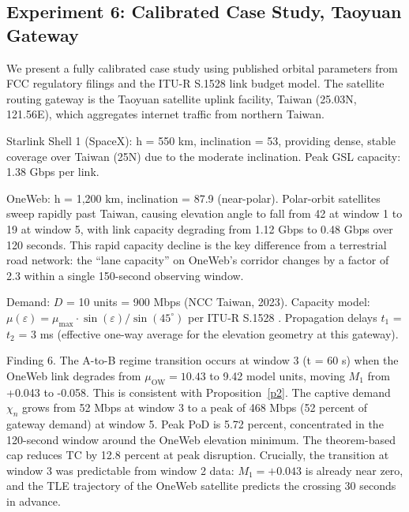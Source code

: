 \documentclass[review,3p,authoryear]{elsarticle}
\begin{document}
\subsection{Experiment 6: Calibrated Case Study, Taoyuan Gateway}
\label{sec6.6}

We present a fully calibrated case study using published orbital parameters from FCC regulatory filings \citet{SpaceX2020,OneWeb} and the ITU-R S.1528 \cite{ITUR} link budget model. The satellite routing gateway is the Taoyuan satellite uplink facility, Taiwan (25.03\textdegree{}N, 121.56\textdegree{}E), which aggregates internet traffic from northern Taiwan.

Starlink Shell 1 (SpaceX): h = 550 km, inclination = 53\textdegree{}, providing dense, stable coverage over Taiwan (25\textdegree{}N) due to the moderate inclination. Peak GSL capacity: 1.38 Gbps per link.

OneWeb: h = 1,200 km, inclination = 87.9\textdegree{} (near-polar). Polar-orbit satellites sweep rapidly past Taiwan, causing elevation angle to fall from 42\textdegree{} at window 1 to 19\textdegree{} at window 5, with link capacity degrading from 1.12 Gbps to 0.48 Gbps over 120 seconds. This rapid capacity decline is the key difference from a terrestrial road network: the ``lane capacity'' on OneWeb's corridor changes by a factor of 2.3 within a single 150-second observing window.

Demand: $D$ = 10 units = 900 Mbps (NCC Taiwan, 2023). Capacity model: ${\mu}({\varepsilon}) = {\mu}_{\max} {\cdot} \sin({\varepsilon}) / \sin(45^{\circ})$ per ITU-R S.1528 \cite{ITUR}. Propagation delays $t_{1}$ = $t_{2}$ = 3 ms (effective one-way average for the elevation geometry at this gateway).

Finding 6. The A-to-B regime transition occurs at window 3 (t = 60 s) when the OneWeb link degrades from ${\mu}_{\mathrm{OW}} = 10.43$ to 9.42 model units, moving $M_{1}$ from +0.043 to -0.058. This is consistent with Proposition~\ref{p2}. The captive demand ${\chi}_{n}$ grows from 52 Mbps at window 3 to a peak of 468 Mbps (52 percent of gateway demand) at window 5. Peak PoD is 5.72 percent, concentrated in the 120-second window around the OneWeb elevation minimum. The theorem-based cap reduces TC by 12.8 percent at peak disruption. Crucially, the transition at window 3 was predictable from window 2 data: $M_{1} = +0.043$ is already near zero, and the TLE trajectory of the OneWeb satellite predicts the crossing 30 seconds in advance.
\end{document}
